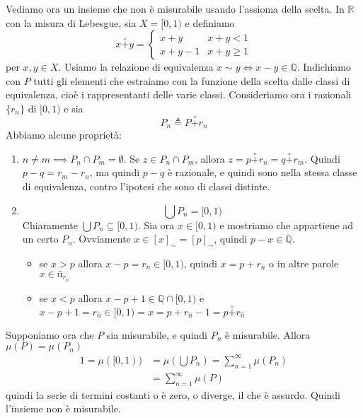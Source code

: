 \documentclass[a4paper]{article}
\begin{document}

Vediamo ora un insieme che non è misurabile usando l'assioma della scelta.
In \(\mathbb{R}\) con la misura di Lebesgue, sia \(X = [0, 1)\)
e definiamo \[
    x \overset{\circ}{+} y = \begin{cases}
        x + y & x + y < 1 \\
        x + y - 1 & x + y \geq 1
    \end{cases}
\]
per \(x,y\in X\). Usiamo la relazione di equivalenza \(x \sim y \iff x-y\in\mathbb{Q}\).
Indichiamo con \(P\) tutti gli elementi che estraiamo con la funzione della scelta dalle classi di equivalenza,
cioè i rappresentanti delle varie classi.
Consideriamo ora i razionali \(\{r_n\}\) di \([0, 1)\) e sia
\[
    P_n \triangleq P \overset{\circ}{+} r_n
\]
Abbiamo alcune proprietà:
\begin{enumerate}
    \item \(n \neq m \implies P_n \cap P_m = \emptyset\).
    Se \(z \in P_n \cap P_m\), allora \(z = p \overset{\circ}{+} r_n = q \overset{\circ}{+} r_m\).
    Quindi \(p-q = r_m - r_n\), ma quindi \(p-q\) è razionale, e quindi sono nella stessa classe di equivalenza,
    contro l'ipotesi che sono di classi distinte.
    \item \[
        \bigcup P_n = [0,1)
    \]
    Chiaramente \(\bigcup P_n \subseteq [0,1)\). Sia ora \(x\in [0,1)\) e mostriamo che appartiene
    ad un certo \(P_n\). Ovviamente \(x\in {[x]}_\sim = {[p]}_\sim\), quindi \(p-x\in\mathbb{Q}\).
    \begin{itemize}
        \item se \(x > p\) allora \(x-p = r_{\overline{n}} \in [0,1)\), quindi
        \(x = p + r_{\overline{n}}\) o in altre parole \(x \in ü_{r_{\overline{n}}}\)
        \item se \(x < p\) allora \(x-p+1 \in \mathbb{Q} \cap [0,1)\) e
        \(x-p+1 = r_{\hat{n}} \in [0,1) = x = p + r_{\hat{n}} - 1 = p \overset{\circ}{+} r_{\hat{n}}\)
    \end{itemize}
\end{enumerate}
Supponiamo ora che \(P\) sia misurabile, e quindi \(P_n\) è misurabile.
Allora \(\mu(P) = \mu(P_n)\)
\begin{align*}
    1 = \mu([0,1)) &= \mu\left(\bigcup P_n\right) = \sum_{n=1}^\infty \mu(P_n) \\
    &= \sum_{n=1}^\infty \mu(P)
\end{align*}
quindi la serie di termini costanti o è zero, o diverge, il che è assurdo.
Quindi l'insieme non è misurabile.
\end{document}
